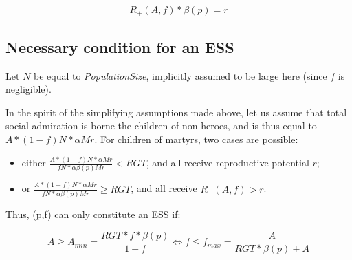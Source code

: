 \documentclass[a4paper,12pt]{report}
\begin{document}
\begin{equation}
    R_+(A,f)*\beta(p) = r
\label{eq:grandchildren}
\end{equation}


\subsection{Necessary condition for an ESS}
\label{ss: exo_existence}

Let $N$ be equal to \emph{PopulationSize}, implicitly assumed to be large here (since $f$
is negligible).

In the spirit of the simplifying assumptions made above, let us assume
that total social admiration is borne the children of non-heroes, and is thus equal to
$A*(1-f)N*\alpha Mr$. For children of martyrs, two cases are possible:

\begin{itemize}
\item either $\frac{A*(1-f)N*\alpha Mr}{fN*\alpha\beta(p)Mr} < RGT$, and 
all receive reproductive potential $r$;
\item or $\frac{A*(1-f)N*\alpha Mr}{fN*\alpha\beta(p)Mr} \geq RGT$, and all receive $R_{+}(A,f)>r$.
\end{itemize}

Thus, (p,f) can only constitute an ESS if:

\begin{equation}
    \label{eq:min_ESS_e}
    A \geq A_{min}=\frac{RGT*f*\beta(p)}{1-f}  
    \iff f \leq f_{max} = \frac{A}{RGT*\beta(p)+A}
\end{equation}




\end{document}
